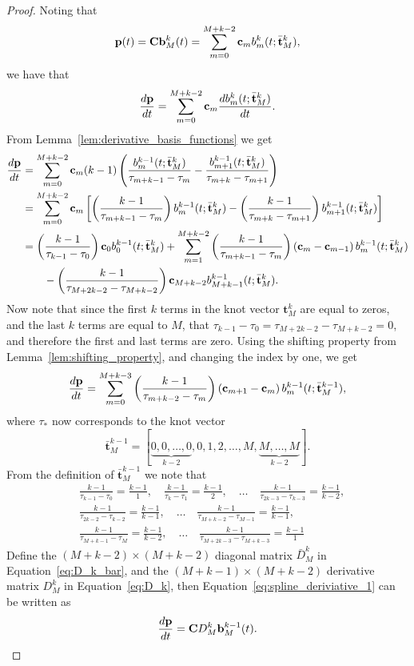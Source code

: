 \begin{proof}
Noting that
\[
\mathbf{p}(t) = \mathbf{C} \mathbf{b}_M^k(t)
              = \sum_{m=0}^{M+k-2} \mathbf{c}_m b_m^k(t; \bar{\mathbf{t}}_M^k),
\]
we have that
\[
\frac{d\mathbf{p}}{dt} = \sum_{m=0}^{M+k-2} \mathbf{c}_m \frac{d b_m^k(t; \bar{\mathbf{t}}_M^k)}{dt}.
\]
From Lemma~\ref{lem:derivative_basis_functions} we get
\begin{align*}
\frac{d\mathbf{p}}{dt} &= \sum_{m=0}^{M+k-2} \mathbf{c}_m (k-1)\left(\frac{b_m^{k-1}(t; \bar{\mathbf{t}}_M^k)}{\tau_{m+k-1}-\tau_m} - \frac{b_{m+1}^{k-1}(t; \bar{\mathbf{t}}_M^k)}{\tau_{m+k}-\tau_{m+1}} \right) \\
&= \sum_{m=0}^{M+k-2} \mathbf{c}_m \left[ \left(\frac{k-1}{\tau_{m+k-1}-\tau_m}\right) b_m^{k-1}(t; \bar{\mathbf{t}}_M^k) - \left(\frac{k-1}{\tau_{m+k}-\tau_{m+1}}\right)  b_{m+1}^{k-1}(t; \bar{\mathbf{t}}_M^k) \right] \\
&= \left(\frac{k-1}{\tau_{k-1}-\tau_0}\right)\mathbf{c}_0 b_0^{k-1}(t; \bar{\mathbf{t}}_M^k) + \sum_{m=1}^{M+k-2} \left(\frac{k-1}{\tau_{m+k-1}-\tau_m}\right) \left(  \mathbf{c}_m - \mathbf{c}_{m-1}  \right) b_m^{k-1}(t; \bar{\mathbf{t}}_M^k) \\
&\qquad - \left(\frac{k-1}{\tau_{M+2k-2}-\tau_{M+k-2}}\right)\mathbf{c}_{M+k-2}b_{M+k-1}^{k-1}(t; \bar{\mathbf{t}}_M^k).
\end{align*}
Now note that since the first $k$ terms in the knot vector $\mathbf{t}_M^k$ are equal to zeros, and the last $k$ terms are equal to $M$, that $\tau_{k-1}-\tau_0 = \tau_{M+2k-2}-\tau_{M+k-2} = 0$, and therefore the first and last terms are zero.  Using the shifting property from Lemma~\ref{lem:shifting_property}, and changing the index by one, we get
\begin{equation}\label{eq:spline_deriviative_1}
\frac{d\mathbf{p}}{dt} = \sum_{m=0}^{M+k-3} \left(\frac{k-1}{\tau_{m+k-2}-\tau_{m}}\right) \left( \cbf_{m+1} - \cbf_{m}  \right) b_{m}^{k-1}(t; \bar{\mathbf{t}}_M^{k-1}),
\end{equation}
where $\tau_\ast$ now corresponds to the knot vector 
\[
\bar{\mathbf{t}}_M^{k-1} = [\underbrace{0, 0, \dots, 0}_{k-2}, 0, 1, 2, \dots, M, \underbrace{M, \dots, M}_{k-2}].
\]
From the definition of $\bar{\mathbf{t}}_M^{k-1}$ we note that
\begin{align*}
& \frac{k-1}{\tau_{k-1}-\tau_0} = \frac{k-1}{1}, \quad
\frac{k-1}{\tau_{k}-\tau_1} = \frac{k-1}{2}, \quad
\dots \quad
\frac{k-1}{\tau_{2k-3}-\tau_{k-3}} = \frac{k-1}{k-2},  \\
&\frac{k-1}{\tau_{2k-2}-\tau_{k-2}} = \frac{k-1}{k-1}, \quad
\dots \quad
\frac{k-1}{\tau_{M+k-2} - \tau_{M-1}} = \frac{k-1}{k-1}, \\
& \frac{k-1}{\tau_{M+k-1} - \tau_{M}} = \frac{k-1}{k-2}, \quad
\dots \quad
\frac{k-1}{\tau_{M+2k-3} - \tau_{M+k-3}} = \frac{k-1}{1}
\end{align*}
Define the $(M+k-2)\times(M+k-2)$ diagonal matrix $\bar{D}_M^k$ in Equation~\eqref{eq:D_k_bar}, and the $(M+k-1)\times (M+k-2)$ derivative matrix $D_M^k$ in Equation~\eqref{eq:D_k},
then Equation~\eqref{eq:spline_deriviative_1} can be written as
\[
\frac{d\mathbf{p}}{dt} = \mathbf{C} D_M^k \mathbf{b}_M^{k-1}(t).
\]
\end{proof}

